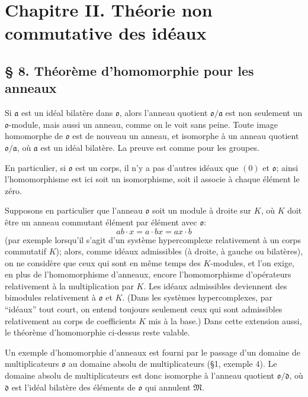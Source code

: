 
\providecommand{\ma}{\mathfrak{a}}
\providecommand{\md}{\mathfrak{d}}
\providecommand{\mo}{\mathfrak{o}}
\providecommand{\mA}{\mathfrak{A}}
\providecommand{\mB}{\mathfrak{B}}
\providecommand{\mC}{\mathfrak{C}}
\providecommand{\mM}{\mathfrak{M}}

\section*{Chapitre II. Théorie non commutative des idéaux}

\subsection*{\S{} 8. Théorème d'homomorphie pour les anneaux}

Si $\ma$ est un idéal bilatère dans $\mo$, alors l'anneau quotient $\mo/\ma$ est non seulement un $\mo$-module, mais aussi un anneau, comme on le voit sans peine. Toute image homomorphe de $\mo$ est de nouveau un anneau, et isomorphe à un anneau quotient $\mo/\ma$, où $\ma$ est un idéal bilatère. La preuve est comme pour les groupes.

En particulier, si $\mo$ est un corps, il n'y a pas d'autres idéaux que $(0)$ et $\mo$; ainsi l'homomorphisme est ici soit un isomorphisme, soit il associe à chaque élément le zéro.

Supposons en particulier que l'anneau $\mo$ soit un module à droite sur $K$, où $K$ doit être un anneau commutant élément par élément avec $\mo$:
\[
        ab\cdot x=a\cdot bx=ax\cdot b
\]
(par exemple lorsqu'il s'agit d'un système hypercomplexe relativement à un corps commutatif $K$); alors, comme idéaux admissibles (à droite, à gauche ou bilatères), on ne considère que ceux qui sont en même temps des $K$-modules, et l'on exige, en plus de l'homomorphisme d'anneaux, encore l'homomorphisme d'opérateurs relativement à la multiplication par $K$. Les idéaux admissibles deviennent des bimodules relativement à $\mo$ et $K$. (Dans les systèmes hypercomplexes, par ``idéaux'' tout court, on entend toujours seulement ceux qui sont admissibles relativement au corps de coefficients $K$ mis à la base.) Dans cette extension aussi, le théorème d'homomorphie ci-dessus reste valable.

Un exemple d'homomorphie d'anneaux est fourni par le passage d'un domaine de multiplicateurs $\mo$ au domaine absolu de multiplicateurs (\S{}1, exemple 4). Le domaine absolu de multiplicateurs est donc isomorphe à l'anneau quotient $\mo/\md$, où $\md$ est l'idéal bilatère des éléments de $\mo$ qui annulent $\mM$.

